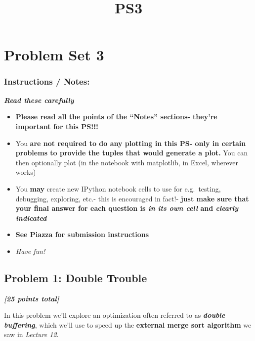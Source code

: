 \documentclass[11pt]{article}
\title{PS3}
\providecommand{\tightlist}{%
      \setlength{\itemsep}{0pt}\setlength{\parskip}{0pt}}
\begin{document}
    
    \maketitle
    
    

    
    \hypertarget{problem-set-3}{%
\section{Problem Set 3}\label{problem-set-3}}

\hypertarget{instructions-notes}{%
\subsubsection{Instructions / Notes:}\label{instructions-notes}}

\textbf{\emph{Read these carefully}}

\begin{itemize}
\tightlist
\item
  \textbf{Please read all the points of the ``Notes'' sections- they're
  important for this PS!!!}
\item
  You \textbf{are not required to do any plotting in this PS- only in
  certain problems to provide the tuples that would generate a plot.}
  You can then optionally plot (in the notebook with matplotlib, in
  Excel, wherever works)
\item
  You \textbf{may} create new IPython notebook cells to use for
  e.g.~testing, debugging, exploring, etc.- this is encouraged in fact!-
  \textbf{just make sure that your final answer for each question is
  \emph{in its own cell} and \emph{clearly indicated}}
\item
  \textbf{See Piazza for submission instructions}
\item
  \emph{Have fun!}
\end{itemize}

    \hypertarget{problem-1-double-trouble}{%
\subsection{Problem 1: Double Trouble}\label{problem-1-double-trouble}}

\textbf{\emph{{[}25 points total{]}}}

In this problem we'll explore an optimization often referred to as
\textbf{\emph{double buffering}}, which we'll use to speed up the
\textbf{external merge sort algorithm} we saw in \emph{Lecture 12}.
\end{document}
